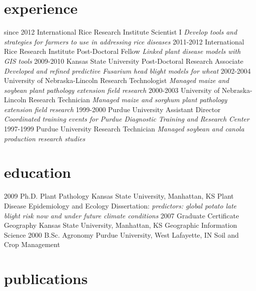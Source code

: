 \documentclass[]{friggeri-cv}
\begin{document}
\section{experience}
\begin{entrylist}
  \entry
    {since 2012}
    {International Rice Research Institute }
    {Scientist I}
    {\emph{Develop tools and strategies for farmers to use in addressing rice diseases}}
  \entry
    {2011-2012}
    {International Rice Research Institute }
    {Post-Doctoral Fellow}
    {\emph{Linked plant disease models with GIS tools}}
  \entry
    {2009-2010}
    {Kansas State University}
    {Post-Doctoral Research Associate}
    {\emph{Developed and refined predictive Fusarium head blight models for wheat}}
  \entry
   {2002-2004}
   {University of Nebraska-Lincoln}
   {Research Technologist}
   {\emph{Managed maize and soybean plant pathology extension field research}}
  \entry
   {2000-2003}
   {University of Nebraska-Lincoln}
   {Research Technician}
   {\emph{Managed maize and sorghum plant pathology extension field research}}
  \entry
   {1999-2000}
   {Purdue University}
   {Assistant Director}
   {\emph{Coordinated training events for Purdue Diagnostic Training and Research Center}}
  \entry
   {1997-1999}
   {Purdue University}
   {Research Technician}
   {\emph{Managed soybean and canola production research studies}}
\end{entrylist}

\section{education}

\begin{entrylist}
  \entry
    {2009}
    {Ph.D. {\normalfont Plant Pathology}}
    {Kansas State University, Manhattan, KS}
    {Plant Disease Epidemiology and Ecology}
  \entry
    {}
    {Dissertation: }
    {}
    {\emph{predictors: global potato late blight risk now and under future climate conditions}}
 \entry
    {2007}
    {Graduate Certificate {\normalfont Geography}}
    {Kansas State University, Manhattan, KS}
    {Geographic Information Science}
  \entry
    {2000}
    {B.Sc. {\normalfont Agronomy}}
    {Purdue University, West Lafayette, IN}
    {Soil and Crop Management}
\end{entrylist}


\section{publications}
\end{document}
